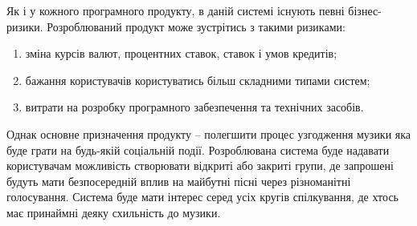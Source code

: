 \begin{enumerate}[label=\alph*)]
    Як і у кожного програмного продукту, в даній системі існують певні бізнес-ризики. Розроблюваний продукт може зустрітись з такими ризиками:

    \begin{enumerate}[label=\arabic*)]
      \item зміна курсів валют, процентних ставок, ставок і умов кредитів;
      \item бажання користувачів користуватись більш складними типами систем;
      \item витрати на розробку програмного забезпечення та технічних засобів.
    \end{enumerate}

    Однак основне призначення продукту – полегшити процес узгодження музики яка буде грати на будь-якій соціальній події. Розроблювана система буде надавати користувачам можливість створювати відкриті або закриті групи, де запрошені будуть мати безпосередній вплив на майбутні пісні через різноманітні голосування. Система буде мати інтерес серед усіх кругів спілкування, де хтось має принаймні деяку схильність до музики.

\end{enumerate}
\newpage
